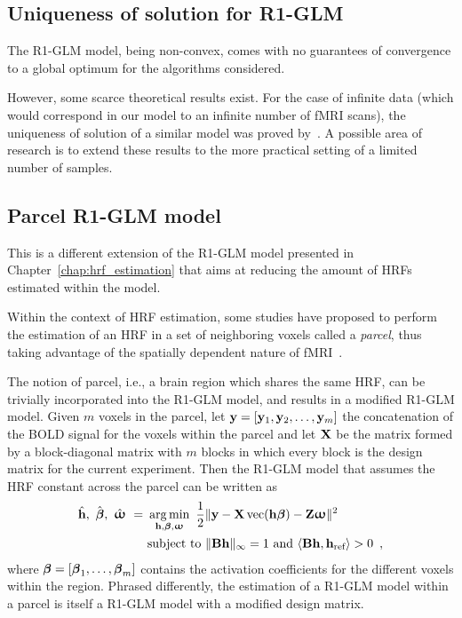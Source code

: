 \subsection{Uniqueness of solution for R1-GLM}

The R1-GLM model, being non-convex, comes with no guarantees of convergence to a global optimum for the algorithms considered.

However, some scarce theoretical results exist. For the case of infinite data (which would correspond in our model to an infinite number of fMRI scans), the uniqueness of solution of a similar model was proved by~\citep{bai2006least}. A possible area of research is to extend these results to the more practical setting of a limited number of samples.



\subsection{Parcel R1-GLM model}


This is a different extension of the R1-GLM model presented in Chapter~\ref{chap:hrf_estimation} that aims at reducing the amount of HRFs estimated within the model.

Within the context of HRF estimation, some studies have proposed to perform the estimation of an HRF in a set of neighboring voxels called a \emph{parcel}, thus taking advantage of the spatially dependent nature of
fMRI~\citep{Wang2013,Chaari2012,Badillo2013a}. 

The notion of parcel, i.e., a brain region which shares the same HRF, can be trivially incorporated into the R1-GLM model, and results in a modified R1-GLM model. Given $m$ voxels in the parcel, let $\mathbf{y} = [\mathbf{y}_1, \mathbf{y}_2, \ldots, \mathbf{y}_m]$ the concatenation of the BOLD signal for the voxels within the parcel and let $\mathbf{X}$ be the matrix formed by a block-diagonal matrix with $m$ blocks in which every block is the design matrix for the current experiment. Then the R1-GLM model that assumes the HRF constant across the parcel can be written as
\begin{eqnarray}
\begin{aligned}
\hat{\mathbf{h}}, ~\hat{{\boldsymbol \beta}},~ \hat{{\boldsymbol \upomega}} ~=~& \operatorname*{arg\,min}_{\mathbf{h}, {\boldsymbol \beta}, {{\boldsymbol \upomega}}} ~ \frac{1}{2}\|\mathbf{y} - \mathbf{X} \operatorname*{vec}(\mathbf{h} {\boldsymbol \beta}) - \mathbf{Z} {{\boldsymbol \upomega}}\| ^2\\
&\text{subject to } \|\mathbf{B} \mathbf{h}\|_{\infty} = 1 \text{ and } \langle \mathbf{B} \mathbf{h}, \mathbf{h}_{\text{ref}}\rangle > 0 \enspace ,
\end{aligned}
\end{eqnarray}
where ${\boldsymbol \beta} = [{\boldsymbol \beta}_1, \ldots, {\boldsymbol \beta}_m]$ contains the activation coefficients for the different voxels within the region. Phrased differently, the estimation of a R1-GLM model within a parcel is itself a R1-GLM model with a modified design matrix.

